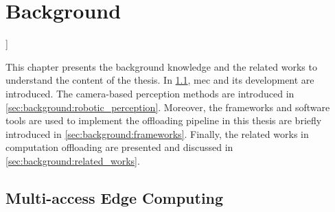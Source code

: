 \chapter{Background}\label{ch:background}]

This chapter presents the background knowledge and the related works to understand the content of the thesis. In \cref{sec:background:mec}, \gls{mec} and its development are introduced. The camera-based perception methods are introduced in \cref{sec:background:robotic_perception}. Moreover, the frameworks and software tools are used to implement the offloading pipeline in this thesis are briefly introduced in \cref{sec:background:frameworks}. Finally, the related works in computation offloading are presented and discussed in \cref{sec:background:related_works}.


\section{Multi-access Edge Computing}\label{sec:background:mec}

